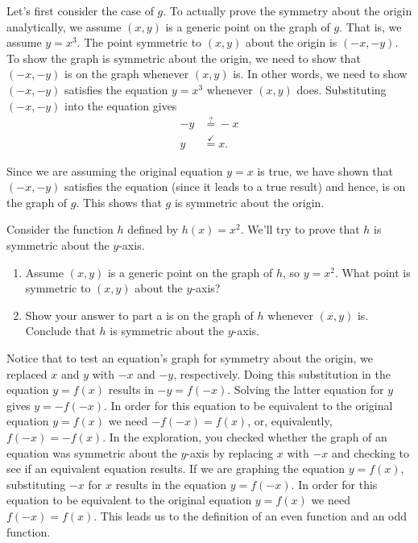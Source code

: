 \documentclass[nooutcomes]{ximera}
\begin{document}
Let's first consider the case of $g$. To actually prove the symmetry about the origin analytically, we assume $(x,y)$ is a generic point on the graph of $g$. That is, we assume  $y = x^3$.  The point symmetric to $(x,y)$ about the origin is $(-x,-y)$.  To show the graph is symmetric about the origin, we need to show that $(-x,-y)$ is on the graph whenever $(x,y)$ is.  In other words, we need to show $(-x,-y)$ satisfies the equation $y = x^3$ whenever $(x,y)$ does.  Substituting $(-x, -y)$ into the equation gives
\begin{align*}
-y &\stackrel{?}{=} -x \\
y &\stackrel{\checkmark}{=} x.
\end{align*}

Since we are assuming the original equation $y = x$ is true, we have shown that $(-x, -y)$ satisfies the equation (since it leads to a true result) and hence, is on the graph of $g$. This shows that $g$ is symmetric about the origin.



\begin{exploration}
Consider the function $h$ defined by $h(x) = x^2$. We'll try to prove that $h$ is symmetric about the $y$-axis. 
\begin{enumerate}[label=\alph*.]
\item Assume $(x, y)$ is a generic point on the graph of $h$, so $y = x^2$. What point is symmetric to $(x, y)$ about the $y$-axis?
\item Show your answer to part a is on the graph of $h$ whenever $(x, y)$ is. Conclude that $h$ is symmetric about the $y$-axis. 
\end{enumerate}
\end{exploration}

Notice that to test an equation's graph for symmetry about the origin, we replaced $x$ and $y$ with $-x$ and $-y$, respectively.  Doing this substitution in the equation $y = f(x)$ results in $-y = f(-x)$.  Solving the latter equation for $y$ gives $y = -f(-x)$.  In order for this equation to be equivalent to the original equation $y=f(x)$ we need $-f(-x) = f(x)$, or, equivalently, $f(-x) = -f(x)$. In the exploration, you checked whether the graph of an equation was symmetric about the $y$-axis by replacing $x$ with $-x$ and checking to see if an equivalent equation results.  If we are graphing the equation $y=f(x)$, substituting $-x$ for $x$ results in the equation $y=f(-x)$.  In order for this equation to be equivalent to the original equation $y=f(x)$ we need $f(-x) = f(x)$. This leads us to the definition of an even function and an odd function.
\end{document}
